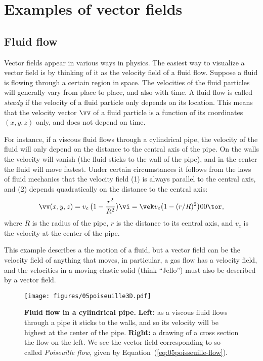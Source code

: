 \section{Examples of vector fields}  

\subsection{Fluid flow}\label{sec:fluid-flow}  
Vector fields appear in various ways in physics.   The easiest way to
visualize a vector field is by thinking of it as the velocity field of a
fluid flow.   Suppose a fluid is flowing through a certain region in space.
The velocities of the fluid particles will generally vary from place to
place, and also with time.   A fluid flow is called \textit{steady} if the
velocity of a fluid particle only depends on its location.   This means that
the velocity vector $\vv$ of a fluid particle is a function of its
coordinates $(x, y, z)$ only, and does not depend on time.

For instance, if a viscous fluid flows through a cylindrical pipe, the
velocity of the fluid will only depend on the distance to the central axis
of the pipe.   On the walls the velocity will vanish (the fluid sticks to
the wall of the pipe), and in the center the fluid will move fastest.
Under certain circumstances it follows from the laws of fluid mechanics
that the velocity field (1) is always parallel to the central axis, and (2)
depends quadratically on the distance to the central axis:
\begin{equation}
  \label{eq:05poisseuille-flow}
  \vv(x, y, z) = v_c\, \bigl(1-\frac{r^2} {R^2}\bigr)\vi
  = \vek v_c \bigl(1-(r/R)^2\bigr) \\ 0\\0\tor ,
\end{equation}
where $R$ is the radius of the pipe, $r$ is the distance to its central
axis, and $v_c$ is the velocity at the center of the pipe.

This example describes a the motion of a fluid, but a vector field can be
the velocity field of anything that moves, in particular, a gas flow has a
velocity field, and the velocities in a moving elastic solid (think
``Jello'') must also be described by a vector field.

\begin{figure}[hb]
  \centering
  \texttt{[image: figures/05poiseuille3D.pdf]}\qquad
  
  \caption{\textbf{Fluid flow in a cylindrical pipe.  } \textbf{Left: } as a
    viscous fluid flows through a pipe it sticks to the walls, and so its
    velocity will be highest at the center of the pipe.  \textbf{Right: } a
    drawing of a cross section the flow on the left.   We see the vector
    field corresponding to so-called \textit{Poiseuille flow,} given by
    Equation~(\ref{eq:05poisseuille-flow}).}
  \label{fig:05poisseuille-flow}
\end{figure}

